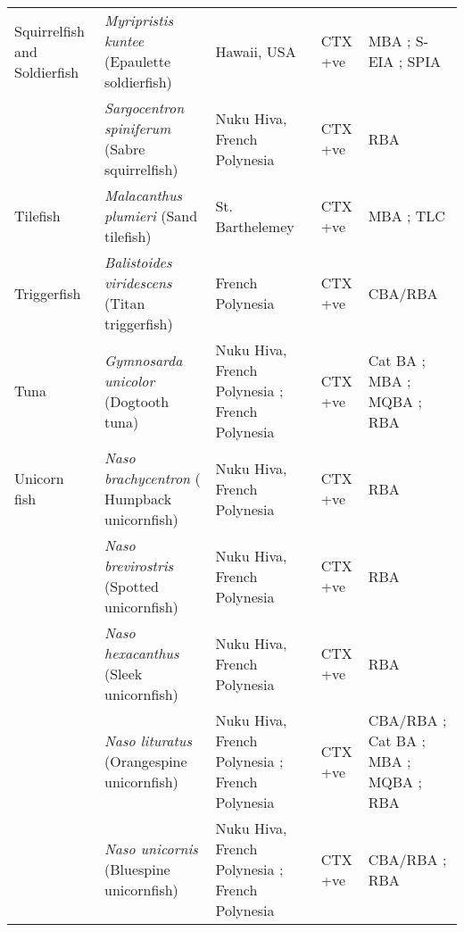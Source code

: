 \documentclass[12pt]{article}
\begin{document}
\begin{longtable}{  | p{2cm} | p{3cm} | p{4.5cm}  | p{2cm} | p{3cm}  | }
  \hline	
 Squirrelfish and Soldierfish &  \emph{Myripristis kuntee} (Epaulette soldierfish) & Hawaii, USA \cite{hokama1993evaluation} & CTX +ve \cite{hokama1993evaluation}  & MBA \cite{hokama1993evaluation}; S-EIA \cite{hokama1993evaluation}; SPIA \cite{hokama1993evaluation}\\
  & \emph{Sargocentron spiniferum} (Sabre squirrelfish)  &  Nuku Hiva, French Polynesia \cite{darius2007ciguatera} & CTX +ve \cite{darius2007ciguatera}  & RBA \cite{darius2007ciguatera} \\
  \hline
 Tilefish & \emph{Malacanthus plumieri} (Sand tilefish) & St. Barthelemey \cite{vernoux1986heterogeneity} & CTX +ve \cite{vernoux1986heterogeneity}  & MBA \cite{vernoux1986heterogeneity}; TLC \cite{vernoux1986heterogeneity} \\
\hline
Triggerfish   & \emph{Balistoides viridescens} (Titan triggerfish) & French Polynesia \cite{chinain2014mail} & CTX +ve \cite{chinain2014mail} & CBA/RBA \cite{chinain2014mail} \\
\hline
Tuna  &  \emph{Gymnosarda unicolor} (Dogtooth tuna) &  Nuku Hiva, French Polynesia \cite{darius2007ciguatera}; French Polynesia \cite{bagnis1987use}  & CTX +ve \cite{darius2007ciguatera,bagnis1987use} & Cat BA \cite{bagnis1987use}; MBA \cite{bagnis1987use}; MQBA \cite{bagnis1987use}; RBA \cite{darius2007ciguatera}\\
\hline
Unicorn fish  & \emph{Naso brachycentron} ( Humpback unicornfish)  & Nuku Hiva, French Polynesia \cite{darius2007ciguatera}  & CTX +ve \cite{darius2007ciguatera} & RBA \cite{darius2007ciguatera} \\
  & \emph{Naso brevirostris} (Spotted unicornfish) & Nuku Hiva, French Polynesia \cite{darius2007ciguatera} & CTX +ve \cite{darius2007ciguatera} & RBA \cite{darius2007ciguatera} \\
  &  \emph{Naso hexacanthus} (Sleek unicornfish) & Nuku Hiva, French Polynesia \cite{darius2007ciguatera} & CTX +ve \cite{darius2007ciguatera} & RBA \cite{darius2007ciguatera} \\
  & \emph{Naso lituratus} (Orangespine unicornfish)  & Nuku Hiva, French Polynesia \cite{darius2007ciguatera}; French Polynesia \cite{chinain2014mail,bagnis1987use} & CTX +ve \cite{darius2007ciguatera,bagnis1987use,chinain2014mail} & CBA/RBA \cite{chinain2014mail}; Cat BA \cite{bagnis1987use}; MBA \cite{bagnis1987use}; MQBA \cite{bagnis1987use}; RBA \cite{darius2007ciguatera}\\
  & \emph{Naso unicornis} (Bluespine unicornfish) & Nuku Hiva, French Polynesia \cite{darius2007ciguatera}; French Polynesia \cite{chinain2014mail} & CTX +ve \cite{darius2007ciguatera,chinain2014mail} & CBA/RBA \cite{chinain2014mail}; RBA \cite{darius2007ciguatera}  \\

\end{longtable}
\end{document}
